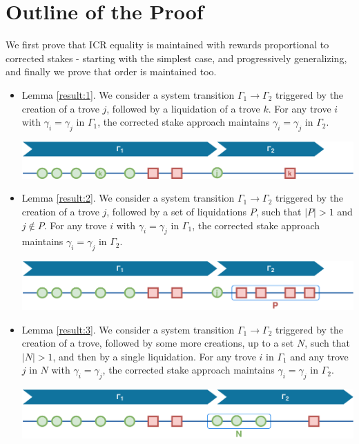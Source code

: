 \documentclass[reqno]{article}
\begin{document}
\section{Outline of the Proof}

We first prove that ICR equality is maintained with rewards proportional to corrected stakes - starting with the simplest case, and progressively generalizing, and finally we prove that order is maintained too.

\begin{itemize}
  \item Lemma \ref{result:1}. We consider a system transition $\Gamma_1 \rightarrow \Gamma_2$ triggered by the creation of a trove $j$, followed by a liquidation of a trove $k$. For any trove $i$ with $\gamma_i = \gamma_j$ in $\Gamma_1$, the corrected stake approach maintains $\gamma_i = \gamma_j$ in $\Gamma_2$.

    \includegraphics[width=\linewidth]{System_order_evolution_1.png}

  \item Lemma \ref{result:2}. We consider a system transition $\Gamma_1 \rightarrow \Gamma_2$ triggered by the creation of a trove $j$, followed by a set of liquidations $P$, such that $|P| > 1$ and $j \notin P$. For any trove $i$ with $\gamma_i = \gamma_j$ in $\Gamma_1$, the corrected stake approach maintains $\gamma_i = \gamma_j$ in $\Gamma_2$.

    \includegraphics[width=\linewidth]{System_order_evolution_2.png}

  \item Lemma \ref{result:3}. We consider a system transition $\Gamma_1 \rightarrow \Gamma_2$ triggered by the creation of a trove, followed by some more creations, up to a set $N$, such that $|N| > 1$, and then by a single liquidation. For any trove $i$ in $\Gamma_1$ and any trove $j$ in $N$ with $\gamma_i = \gamma_j$, the corrected stake approach maintains $\gamma_i = \gamma_j$ in $\Gamma_2$.

    \includegraphics[width=\linewidth]{System_order_evolution_3.png}


\end{itemize}
\end{document}
